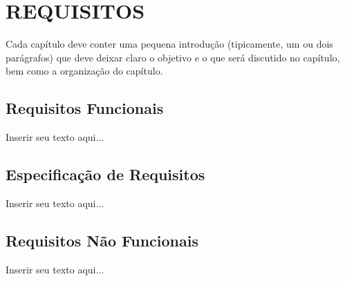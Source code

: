 
\chapter{REQUISITOS}
\label{chap:requisitos}
Cada capítulo deve conter uma pequena introdução (tipicamente, um ou dois parágrafos) que deve deixar claro o objetivo e o que será discutido no capítulo, bem como a organização do capítulo.

\section{Requisitos Funcionais}
\label{sec:titSecReqFunc}

Inserir seu texto aqui...



\section{Especificação de Requisitos}
\label{sec:titSecEspReq}

Inserir seu texto aqui...



\section{Requisitos Não Funcionais}
\label{sec:titSecReqNaoFunc}

Inserir seu texto aqui...

